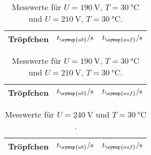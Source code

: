 \begin{table}
  \centering
  \caption{Messwerte für $U=\SI{190}{\volt}$, $T=\SI{30}{\celsius}$ und
  $U=\SI{210}{\volt}$, $T=\SI{30}{\celsius}$.}
  \label{tab:t34}
  \begin{tabular}{c c c}
    \toprule
    Tröpfchen & $t_{\symup{ab}}/\unit{\second}$ & $t_{\symup{auf}}/\unit{\second}$ \\
    \midrule
    \bottomrule
  \end{tabular}
  \quad
  \begin{tabular}{c c c}
    \toprule
    Tröpfchen & $t_{\symup{ab}}/\unit{\second}$ & $t_{\symup{auf}}/\unit{\second}$ \\
    \midrule
    \bottomrule
  \end{tabular}
\end{table}

\begin{table}
  \centering
  \caption{Messwerte für $U=\SI{240}{\volt}$ und $T=\SI{30}{\celsius}$.}
  \label{tab:t5}
  \begin{tabular}{c c c}
    \toprule
    Tröpfchen & $t_{\symup{ab}}/\unit{\second}$ & $t_{\symup{auf}}/\unit{\second}$ \\
    \midrule
    \bottomrule
  \end{tabular}
\end{table}

